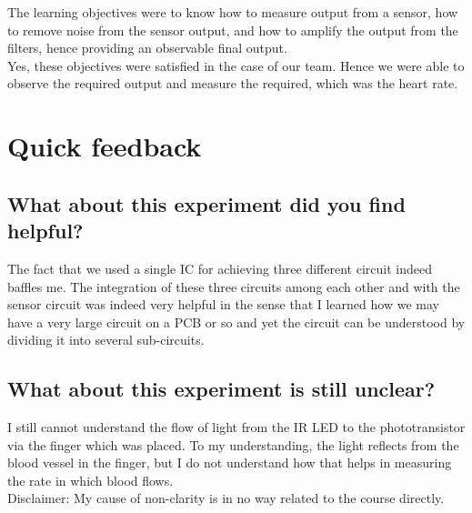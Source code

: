 \documentclass[12pt]{article}
\begin{document}
\begin{multicols}{2}
The learning objectives were to know how to measure output from a sensor, how to remove noise from the sensor output, and how to amplify the output from the filters, hence providing an observable final output.\\
Yes, these objectives were satisfied in the case of our team. Hence we were able to observe the required output and measure the required, which was the heart rate.

\section{Quick feedback}

\subsection{What about this experiment did you find helpful?}
The fact that we used a single IC for achieving three different circuit indeed baffles me. The integration of these three circuits among each other and with the sensor circuit was indeed very helpful in the sense that I learned how we may have a very large circuit on a PCB or so and yet the circuit can be understood by dividing it into several sub-circuits.

\subsection{What about this experiment is still unclear?}
I still cannot understand the flow of light from the IR LED to the phototransistor via the finger which was placed. To my understanding, the light reflects from the blood vessel in the finger, but I do not understand how that helps in measuring the rate in which blood flows.\\
Disclaimer: My cause of non-clarity is in no way related to the course directly.

\end{multicols}
\end{document}
